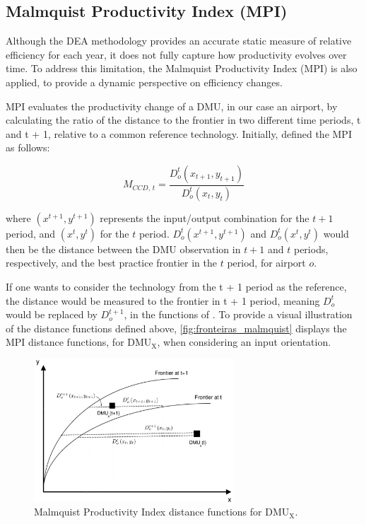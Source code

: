 \subsection{Malmquist Productivity Index (MPI)}
\label{mpi}

 Although the DEA methodology provides an accurate
static measure of relative efficiency for each year, it does not fully capture how productivity evolves over
time. To address this limitation, the Malmquist Productivity Index (MPI) is also applied, to provide a
dynamic perspective on efficiency changes.

MPI evaluates the productivity change of a DMU, in our case an airport, by calculating the ratio of
the distance to the frontier in two different time periods, t and t + 1, relative to a common reference
technology. Initially, \cite{caves1982} defined the MPI as follows:

\begin{equation}   
    \label{eq:MI1} 
M_{CCD,\,t} = \frac{D^{t}_{o}\left(x_{t+1}, y_{t+1}\right)}{D^{t}_{o}\left(x_{t}, y_{t}\right)}         
\end{equation}




where $\left(x^{t+1}, y^{t+1}\right)$ represents the input/output combination for the $t+1$ period, and $\left(x^{t}, y^{t}\right)$  for the $t$ period. $D^{t}_{o}\left(x^{t+1}, y^{t+1}\right)$ and $D^{t}_{o}\left(x^{t}, y^{t}\right)$ would then be the distance between the DMU observation in $t+1$ and $t$ periods, respectively, and the best practice frontier in the $t$ period, for airport $o$. 

If one wants to consider the technology from the t + 1 period as the reference, the distance would be measured to the frontier in t + 1 period, meaning $D^{t}_{o}$ would be replaced by $D^{t+1}_{o}$, in the functions of . To provide a visual illustration of the distance functions defined above, \autoref{fig:fronteiras_malmquist} displays the MPI
distance functions, for $\text{DMU}_\text{X}$, when considering an input orientation.

\begin{figure}[H]
  \centering
  \includegraphics[width=7.5cm]{images/fronteiras_malmquist.jpg}
  \vspace{-0.5cm}
  \caption{Malmquist Productivity Index distance functions for $\text{DMU}_\text{X}$.}
  \label{fig:fronteiras_malmquist}
\end{figure}

